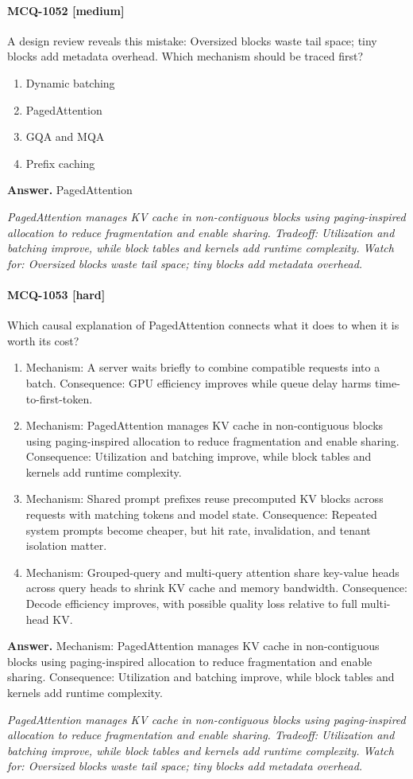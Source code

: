 \paragraph{MCQ-1052 [medium]} A design review reveals this mistake: Oversized blocks waste tail space; tiny blocks add metadata overhead. Which mechanism should be traced first?
\begin{enumerate}[label=\Alph*.]
\item Dynamic batching
\item PagedAttention
\item GQA and MQA
\item Prefix caching
\end{enumerate}
\noindent\textbf{Answer.} PagedAttention
\par\textit{PagedAttention manages KV cache in non-contiguous blocks using paging-inspired allocation to reduce fragmentation and enable sharing. Tradeoff: Utilization and batching improve, while block tables and kernels add runtime complexity. Watch for: Oversized blocks waste tail space; tiny blocks add metadata overhead.}
\paragraph{MCQ-1053 [hard]} Which causal explanation of PagedAttention connects what it does to when it is worth its cost?
\begin{enumerate}[label=\Alph*.]
\item Mechanism: A server waits briefly to combine compatible requests into a batch. Consequence: GPU efficiency improves while queue delay harms time-to-first-token.
\item Mechanism: PagedAttention manages KV cache in non-contiguous blocks using paging-inspired allocation to reduce fragmentation and enable sharing. Consequence: Utilization and batching improve, while block tables and kernels add runtime complexity.
\item Mechanism: Shared prompt prefixes reuse precomputed KV blocks across requests with matching tokens and model state. Consequence: Repeated system prompts become cheaper, but hit rate, invalidation, and tenant isolation matter.
\item Mechanism: Grouped-query and multi-query attention share key-value heads across query heads to shrink KV cache and memory bandwidth. Consequence: Decode efficiency improves, with possible quality loss relative to full multi-head KV.
\end{enumerate}
\noindent\textbf{Answer.} Mechanism: PagedAttention manages KV cache in non-contiguous blocks using paging-inspired allocation to reduce fragmentation and enable sharing. Consequence: Utilization and batching improve, while block tables and kernels add runtime complexity.
\par\textit{PagedAttention manages KV cache in non-contiguous blocks using paging-inspired allocation to reduce fragmentation and enable sharing. Tradeoff: Utilization and batching improve, while block tables and kernels add runtime complexity. Watch for: Oversized blocks waste tail space; tiny blocks add metadata overhead.}
